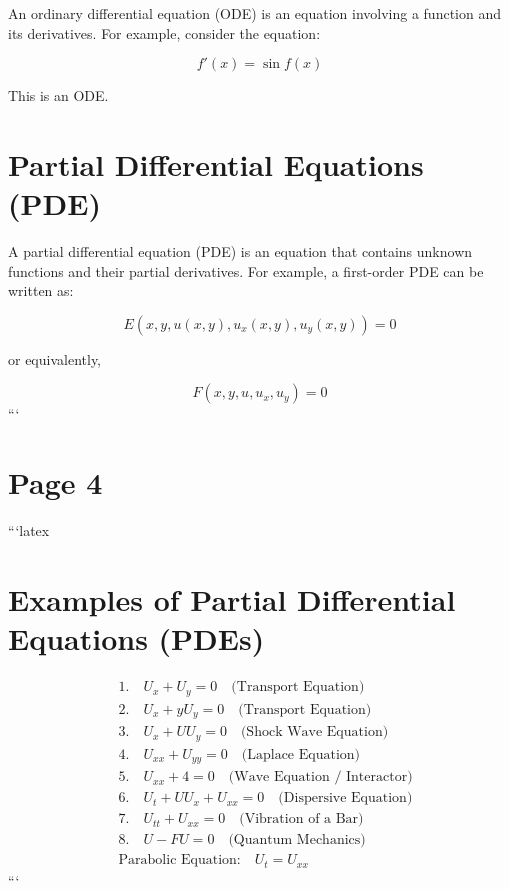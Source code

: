 \documentclass[11pt]{article}
\begin{document}
An ordinary differential equation (ODE) is an equation involving a function and its derivatives. For example, consider the equation:

\begin{equation}
f'(x) = \sin f(x)
\end{equation}

This is an ODE.

\section*{Partial Differential Equations (PDE)}

A partial differential equation (PDE) is an equation that contains unknown functions and their partial derivatives. For example, a first-order PDE can be written as:

\begin{equation}
E(x, y, u(x, y), u_x(x, y), u_y(x, y)) = 0
\end{equation}

or equivalently,

\begin{equation}
F(x, y, u, u_x, u_y) = 0
\end{equation}
```
\clearpage
\section*{Page 4}

```latex
\section*{Examples of Partial Differential Equations (PDEs)}

\begin{align}
    &1. \quad U_x + U_y = 0 \quad \text{(Transport Equation)} \\
    &2. \quad U_x + y U_y = 0 \quad \text{(Transport Equation)} \\
    &3. \quad U_x + U U_y = 0 \quad \text{(Shock Wave Equation)} \\
    &4. \quad U_{xx} + U_{yy} = 0 \quad \text{(Laplace Equation)} \\
    &5. \quad U_{xx} + 4 = 0 \quad \text{(Wave Equation / Interactor)} \\
    &6. \quad U_t + U U_x + U_{xx} = 0 \quad \text{(Dispersive Equation)} \\
    &7. \quad U_{tt} + U_{xx} = 0 \quad \text{(Vibration of a Bar)} \\
    &8. \quad U - F U = 0 \quad \text{(Quantum Mechanics)} \\
    &\text{Parabolic Equation:} \quad U_t = U_{xx}
\end{align}
```
\clearpage
\end{document}
